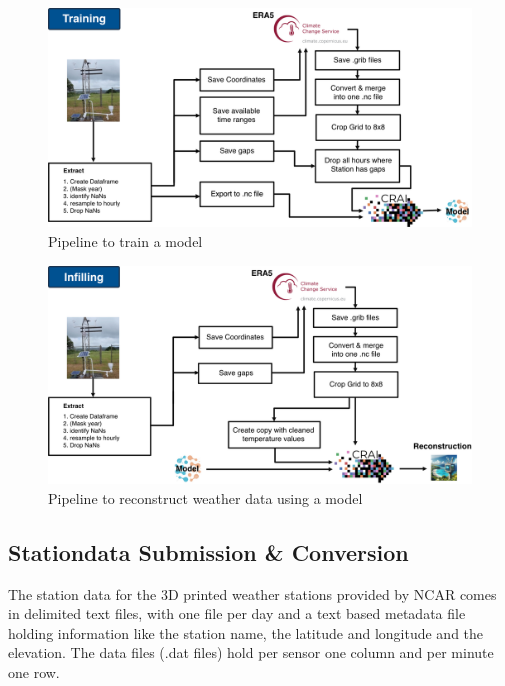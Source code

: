 \begin{figure}
    \centering
    \includegraphics[width=450pt]{resources/images/training_pipeline.png}
    \caption{Pipeline to train a model}
    \label{fig:training_pipeline}
\end{figure}

\begin{figure}
    \centering
    \includegraphics[width=450pt]{resources/images/infilling_pipeline.png}
    \caption{Pipeline to reconstruct weather data using a model}
    \label{fig:infilling_pipeline}
\end{figure}

\subsection{Stationdata Submission \& Conversion}

The station data for the 3D printed weather stations provided by NCAR comes in delimited text files, with one file per day and a text based metadata file holding information like the station name, the latitude and longitude and the elevation.
The data files (.dat files) hold per sensor one column and per minute one row.

